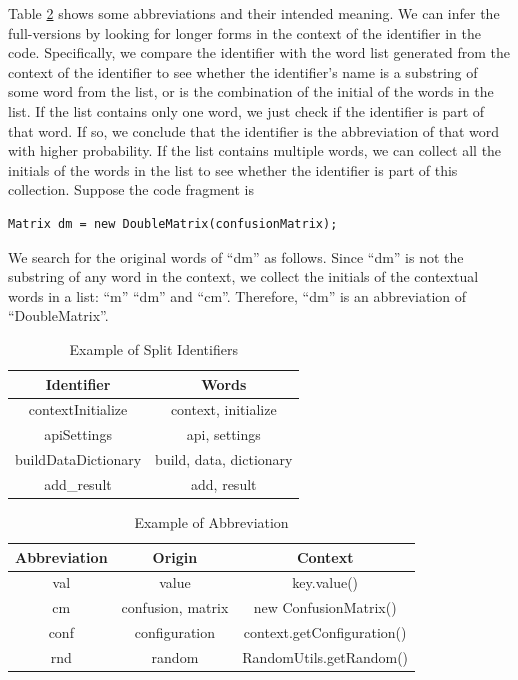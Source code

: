 Table \ref{table:abbr} shows some abbreviations and
their intended meaning. We can infer the full-versions by
looking for longer forms in the context of the identifier in the code.
Specifically, we compare the identifier with the word list generated from
the context of the identifier to see whether the identifier's name
is a substring of some word from the list, or is the combination of
the initial of the words in the list.
If the list contains only one word, we just check if the identifier
is part of that word. If so, we conclude that the identifier is the
abbreviation of that word with higher probability.
If the list contains multiple words, we can collect all the initials 
of the words in the list to see whether the identifier is part of
this collection. Suppose the code fragment is
\begin{lstlisting}
Matrix dm = new DoubleMatrix(confusionMatrix);
\end{lstlisting}
We search for the original words of ``dm'' as follows.
Since ``dm'' is not the substring of any word in the context,
we collect the initials of the contextual words in a list:
``m'' ``dm'' and ``cm''.
Therefore, ``dm'' is an abbreviation of ``DoubleMatrix''.

\begin{table}[th]
\caption{\label{table:splitID} Example of Split Identifiers}
\center
\scriptsize{
\begin{tabular}{|c|c|}
\hline
Identifier & Words \\
\hline \hline
contextInitialize & context, initialize\\
\hline
apiSettings & api, settings\\
\hline
buildDataDictionary & build, data, dictionary\\
\hline
add\_result & add, result\\
\hline
\end{tabular}
}
\end{table}

\begin{table}[th]
\caption{Example of Abbreviation}
\label{table:abbr}
\center
\scriptsize{
\begin{tabular}{|c|c|c|}
\hline
Abbreviation & Origin & Context\\
\hline \hline
val & value & key.value()\\
\hline
cm & confusion, matrix & new ConfusionMatrix()\\
\hline
conf & configuration & context.getConfiguration()\\
\hline
rnd & random & RandomUtils.getRandom()\\
\hline
\end{tabular}
}
\end{table}

